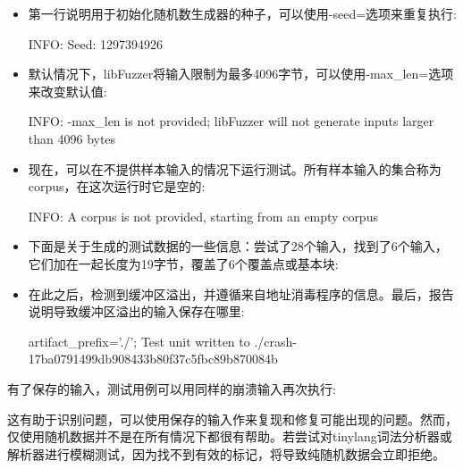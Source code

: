 \begin{itemize}
\item
第一行说明用于初始化随机数生成器的种子，可以使用-seed=选项来重复执行:

\begin{shell}
INFO: Seed: 1297394926
\end{shell}

\item
默认情况下，libFuzzer将输入限制为最多4096字节，可以使用-max\_len=选项来改变默认值:

\begin{shell}
INFO: -max_len is not provided; libFuzzer will not generate
inputs larger than 4096 bytes
\end{shell}

\item
现在，可以在不提供样本输入的情况下运行测试。所有样本输入的集合称为corpus，在这次运行时它是空的:

\begin{shell}
INFO: A corpus is not provided, starting from an empty corpus
\end{shell}

\item
下面是关于生成的测试数据的一些信息：尝试了28个输入，找到了6个输入，它们加在一起长度为19字节，覆盖了6个覆盖点或基本块:


\item
在此之后，检测到缓冲区溢出，并遵循来自地址消毒程序的信息。最后，报告说明导致缓冲区溢出的输入保存在哪里:

\begin{shell}
artifact_prefix='./'; Test unit written to ./crash-17ba0791499db908433b80f37c5fbc89b870084b
\end{shell}
\end{itemize}

有了保存的输入，测试用例可以用同样的崩溃输入再次执行:


这有助于识别问题，可以使用保存的输入作来复现和修复可能出现的问题。然而，仅使用随机数据并不是在所有情况下都很有帮助。若尝试对tinylang词法分析器或解析器进行模糊测试，因为找不到有效的标记，将导致纯随机数据会立即拒绝。

